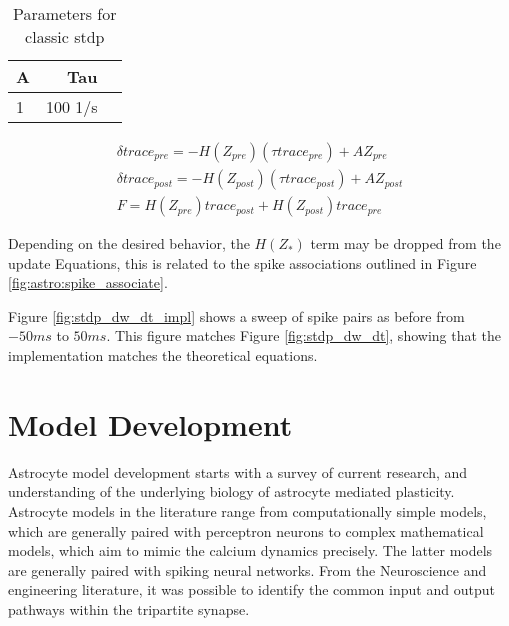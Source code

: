 \begin{table}[!htp] \centering
  \caption{Parameters for classic \gls{stdp}} \label{table:classic_stdp_params}
  \scriptsize
  \begin{tabular}{lrr}\toprule
    A &Tau \\\midrule
    1 &100 1/s \\
    \bottomrule
  \end{tabular}
\end{table}


\begin{align}
  \delta trace_{pre} = -H(Z_{pre})(\tau trace_{pre}) +
  A Z_{pre} \label{eq:song_impl_pre} \\ 
  \delta trace_{post} = -H(Z_{post})(\tau trace_{post}) +
  A Z_{post} \label{eq:song_impl_post} \\
  F = H(Z_{pre}) trace_{post} + H(Z_{post}) trace_{pre} \label{eq:song_impl_dw}
\end{align}

Depending on the desired behavior, the $H(Z_*)$ term may be dropped from the
update Equations, this is related to the spike associations outlined in Figure
\ref{fig:astro:spike_associate}.

Figure \ref{fig:stdp_dw_dt_impl} shows a sweep of spike pairs as before from
$-50ms$ to $50ms$. This figure matches Figure \ref{fig:stdp_dw_dt}, showing that
the implementation matches the theoretical equations.




\section{Model Development}
Astrocyte model development starts with a survey of current research, and
understanding of the underlying biology of astrocyte mediated
plasticity. Astrocyte models in the literature range from computationally simple
models, which are generally paired with perceptron neurons to complex
mathematical models, which aim to mimic the calcium dynamics precisely. The
latter models are generally paired with spiking neural networks. From the
Neuroscience and engineering literature, it was possible to identify the common
input and output pathways within the tripartite synapse. 

